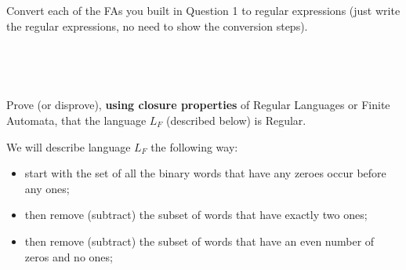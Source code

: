 \documentclass[12pt]{article}
\newenvironment{exercise}[2][Exercise]{\begin{trivlist}
\item[\hskip \labelsep {\bfseries #1}\hskip \labelsep {\bfseries #2.}]}{\end{trivlist}}
\newenvironment{solution}[1][{\color{red} Solution:}]{\begin{trivlist}
\item[\hskip \labelsep {\bfseries #1}\hskip \labelsep {\bfseries}]}{\end{trivlist}}
\begin{document}
\newpage


\begin{exercise}{2}
Convert each of the FAs you built in Question 1 to regular expressions (just write the regular expressions, no need to show the conversion steps).
\end{exercise}

\begin{enumerate}[(a)]
	\item
	\begin{solution} \;\\
	
	\end{solution}
	
	\item
	\begin{solution}  \;\\
	
	\end{solution}
	
	\item
	\begin{solution}
	
	\end{solution}
	
\end{enumerate}

\clearpage

\begin{exercise}{3}

Prove (or disprove), \textbf{using closure properties} of Regular Languages or Finite Automata, that the language $L_F$ (described below) is Regular.

We will describe language $L_F$ the following way: 

\begin{itemize}
    \item start with the set of all the binary words that have any zeroes occur before any ones;
    \item then remove (subtract) the subset of words that have exactly two ones;
    \item then remove (subtract) the subset of words that have an even number of zeros and no ones;
\end{itemize}

\end{exercise}
\end{document}
